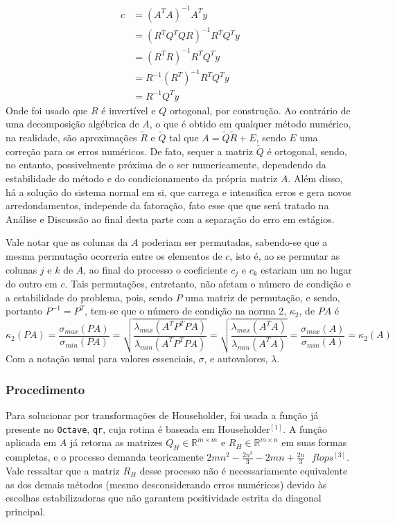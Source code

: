 \documentclass[a4paper, 12pt]{article}
\newcommand*\R{\mathbb{R}}
\begin{document}
\begin{align}
\label{eqn:nor}
c&=(A^TA)^{-1}A^Ty \nonumber \\
&=(R^TQ^TQR)^{-1}R^TQ^Ty \nonumber \\
&=(R^TR)^{-1}R^TQ^Ty \nonumber \\
&=R^{-1}(R^T)^{-1}R^TQ^Ty \nonumber \\
&=R^{-1}Q^Ty
\end{align}
Onde foi usado que $R$ é invertível e $Q$ ortogonal, por construção. Ao contrário de uma decomposição algébrica de $A$, o que é obtido em qualquer método numérico, na realidade, são aproximações $\tilde{R}$ e $\tilde{Q}$ tal que $A=\tilde{Q}\tilde{R}+E$, sendo $E$ uma correção para os erros numéricos. De fato, sequer a matriz $\tilde{Q}$ é ortogonal, sendo, no entanto, possivelmente próxima de o ser numericamente, dependendo da estabilidade do método e do condicionamento da própria matriz $A$. Além disso, há a solução do sistema normal em si, que carrega e intensifica erros e gera novos arredondamentos, independe da fatoração, fato esse que que será tratado na Análise e Discussão ao final desta parte com a separação do erro em estágios. 

Vale notar que as colunas da $A$ poderiam ser permutadas, sabendo-se que a mesma permutação ocorreria entre os elementos de $c$, isto é, ao se permutar as colunas $j$ e $k$ de $A$, ao final do processo o coeficiente $c_j$ e $c_k$ estariam um no lugar do outro em $c$. Tais permutações, entretanto, não afetam o número de condição e a estabilidade do problema, pois, sendo $P$ uma matriz de permutação, e sendo, portanto $P^{-1}=P^T$, tem-se que o número de condição na norma 2, $\kappa_2$, de $PA$ é
\[
\kappa_2(PA)=\frac{\sigma_{max}(PA)}{\sigma_{min}(PA)}=\sqrt{\frac{\lambda_{max}(A^TP^TPA)}{\lambda_{min}(A^TP^TPA)}}=\sqrt{\frac{\lambda_{max}(A^TA)}{\lambda_{min}(A^TA)}}=\frac{\sigma_{max}(A)}{\sigma_{min}(A)}=\kappa_2(A)
\]
Com a notação usual para valores essenciais, $\sigma$, e autovalores, $\lambda$.

\subsubsection{Procedimento}
Para solucionar por transformações de Householder, foi usada a função já presente no \verb+Octave+, \verb+qr+, cuja rotina é baseada em Householder$^{[1]}$. A função aplicada em $A$ já retorna as matrizes $Q_H\in \R^{m\times m}$ e $R_H\in \R^{m\times n}$ em suas formas completas, e o processo demanda teoricamente $2mn^2-\frac{2n^3}{3}-2mn+\frac{2n}{3}\text{ }flops^{[3]}$. Vale ressaltar que a matriz $R_H$ desse processo não é necessariamente equivalente as dos demais métodos (mesmo desconsiderando erros numéricos) devido às escolhas estabilizadoras que não garantem positividade estrita da diagonal principal.
 
\end{document}
